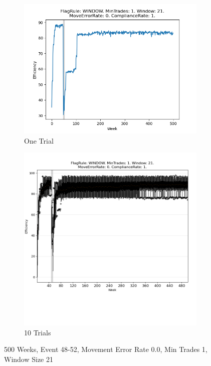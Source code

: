 \documentclass{article}%
\begin{document}
%


\begin{figure}[!htb]%
\begin{subfigure}[b]{0.45\linewidth}%
\includegraphics[width=\linewidth]{1051fr_WINDOW_mt_1_ws_21_er_0_cr_1_t1.png}%
\caption{One Trial}%
\end{subfigure}%
\begin{subfigure}[b]{0.45\linewidth}%
\includegraphics[clip,width=\linewidth,trim=0 4cm 0 0]{1051fr_WINDOW_mt_1_ws_21_er_0_cr_1_t10.png}%
\caption{10 Trials}%
\end{subfigure}%
\caption{500 Weeks, Event 48{-}52, Movement Error Rate 0.0, Min Trades 1, Window Size 21}%
\end{figure}
\end{document}
